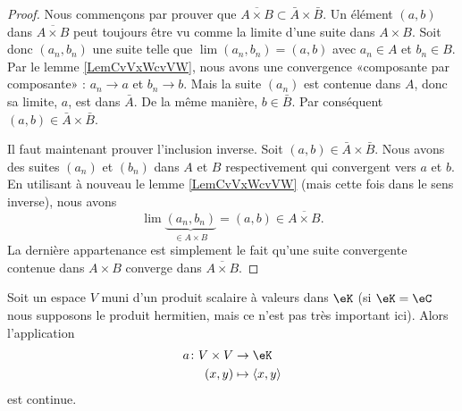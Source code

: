 \begin{proof}
	Nous commençons par prouver que $\overline{ A\times B }\subset\bar A\times \bar B$. Un élément $(a,b)$ dans $\overline{ A\times B }$ peut toujours être vu comme la limite d'une suite dans $A\times B$. Soit donc $(a_n,b_n)$ une suite telle que $\lim(a_n,b_n)=(a,b)$ avec $a_n\in A$ et $b_n\in B$. Par le lemme \ref{LemCvVxWcvVW}, nous avons une convergence «composante par composante» : $a_n\to a$ et $b_n\to b$. Mais la suite $(a_n)$ est contenue dans $A$, donc sa limite, $a$, est dans $\bar A$. De la même manière, $b\in\bar B$. Par conséquent $(a,b)\in \bar A\times\bar B$.

	Il faut maintenant prouver l'inclusion inverse. Soit $(a,b)\in\bar A\times \bar B$. Nous avons des suites $(a_n)$ et $(b_n)$ dans $A$ et $B$ respectivement qui convergent vers $a$ et $b$. En utilisant à nouveau le lemme \ref{LemCvVxWcvVW} (mais cette fois dans le sens inverse), nous avons
	\begin{equation}
		\lim\underbrace{(a_n,b_n)}_{\in A\times B}=(a,b)\in\overline{ A\times B }.
	\end{equation}
	La dernière appartenance est simplement le fait qu'une suite convergente contenue dans $A\times B$ converge dans $\overline{ A\times B }$.
\end{proof}



\begin{proposition}          \label{PROPooKDGOooDjWQct}
	Soit un espace \( V\) muni d'un produit scalaire à valeurs dans \( \eK\) (si \( \eK=\eC\) nous supposons le produit hermitien, mais ce n'est pas très important ici). Alors l'application
	\begin{equation}
		\begin{aligned}
			a\colon V\times V & \to \eK                     \\
			(x,y)             & \mapsto \langle x, y\rangle
		\end{aligned}
	\end{equation}
	est continue.
\end{proposition}

